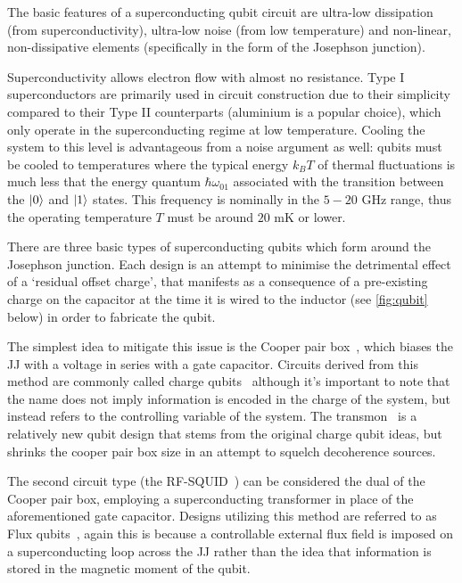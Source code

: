 The basic features of a superconducting qubit circuit are ultra-low dissipation (from superconductivity), ultra-low noise (from low temperature) and non-linear, non-dissipative elements (specifically in the form of the Josephson junction).

Superconductivity allows electron flow with almost no resistance.
Type I superconductors are primarily used in circuit construction due to their simplicity compared to their Type II counterparts (aluminium is a popular choice), which only operate in the superconducting regime at low temperature.
Cooling the system to this level is advantageous from a noise argument as well: qubits must be cooled to temperatures where the typical energy $k_B T$ of thermal fluctuations is much less that the energy quantum $\hbar \omega_{01}$ associated with the transition between the $\lvert0\rangle$ and $\lvert1\rangle$ states.
This frequency is nominally in the $5\!-\!20$ GHz range, thus the operating temperature $T$ must be around $20$ mK or lower.

There are three basic types of superconducting qubits which form around the Josephson junction.
Each design is an attempt to minimise the detrimental effect of a `residual offset charge', that manifests as a consequence of a pre-existing charge on the capacitor at the time it is wired to the inductor (see \cref{fig:qubit} below) in order to fabricate the qubit.

The simplest idea to mitigate this issue is the Cooper pair box~\cite{Nakamura1999,Bouchiat1998}, which biases the JJ with a voltage in series with a gate capacitor.
Circuits derived from this method are commonly called charge qubits~\cite{Makhlin2001,Vion2002} although it's important to note that the name does not imply information is encoded in the charge of the system, but instead refers to the controlling variable of the system.
The transmon~\cite{Wallraff2004, Schreier2008} is a relatively new qubit design that stems from the original charge qubit ideas, but shrinks the cooper pair box size in an attempt to squelch decoherence sources.

The second circuit type (the RF-SQUID~\cite{Barone1982}) can be considered the dual of the Cooper pair box, employing a superconducting transformer in place of the aforementioned gate capacitor.
Designs utilizing this method are referred to as Flux qubits~\cite{Mooij1999,VanderWal2000,Chiorescu2003}, again this is because a controllable external flux field is imposed on a superconducting loop across the JJ rather than the idea that information is stored in the magnetic moment of the qubit.

